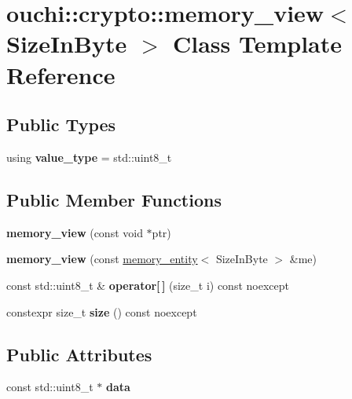 \hypertarget{classouchi_1_1crypto_1_1memory__view}{}\section{ouchi\+::crypto\+::memory\+\_\+view$<$ Size\+In\+Byte $>$ Class Template Reference}
\label{classouchi_1_1crypto_1_1memory__view}
\subsection*{Public Types}
\begin{DoxyCompactItemize}
\item 
\mbox{\label{classouchi_1_1crypto_1_1memory__view_aa3365f51cbc999ced8231dd87d400206}} 
using {\bfseries value\+\_\+type} = std\+::uint8\+\_\+t
\end{DoxyCompactItemize}
\subsection*{Public Member Functions}
\begin{DoxyCompactItemize}
\item 
\mbox{\label{classouchi_1_1crypto_1_1memory__view_a5c27fc91fda6975a1b693169b97c9332}} 
{\bfseries memory\+\_\+view} (const void $\ast$ptr)
\item 
\mbox{\label{classouchi_1_1crypto_1_1memory__view_af985753f08c7cf67592560ddcca432a8}} 
{\bfseries memory\+\_\+view} (const \mbox{\hyperlink{structouchi_1_1crypto_1_1memory__entity}{memory\+\_\+entity}}$<$ Size\+In\+Byte $>$ \&me)
\item 
\mbox{\label{classouchi_1_1crypto_1_1memory__view_a76e1b9cb701542962ebca57ac3fcb35f}} 
const std\+::uint8\+\_\+t \& {\bfseries operator\mbox{[}$\,$\mbox{]}} (size\+\_\+t i) const noexcept
\item 
\mbox{\label{classouchi_1_1crypto_1_1memory__view_a7c3718b4a17e2df7bc02acf38aa2b737}} 
constexpr size\+\_\+t {\bfseries size} () const noexcept
\end{DoxyCompactItemize}
\subsection*{Public Attributes}
\begin{DoxyCompactItemize}
\item 
\mbox{\label{classouchi_1_1crypto_1_1memory__view_a1a6ee83ab6aba45a8459daeda76ef58d}} 
const std\+::uint8\+\_\+t $\ast$ {\bfseries data}
\end{DoxyCompactItemize}
